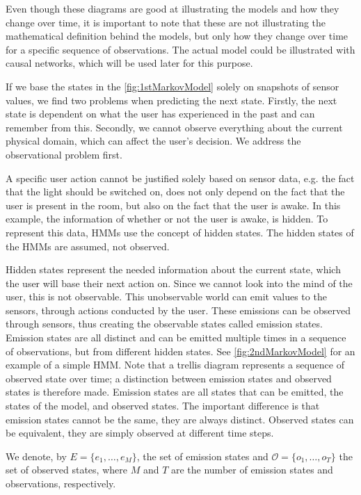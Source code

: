 Even though these diagrams are good at illustrating the models and how they change over time, it is important to note that these are not illustrating the mathematical definition behind the models, but only how they change over time for a specific sequence of observations. The actual model could be illustrated with causal networks, which will be used later for this purpose.

If we base the states in the \cref{fig:1stMarkovModel} solely on snapshots of sensor values, we find two problems when predicting the next state. Firstly, the next state is dependent on what the user has experienced in the past and can remember from this. Secondly, we cannot observe everything about the current physical domain, which can affect the user's decision. We address the observational problem first.

A specific user action cannot be justified solely based on sensor data, e.g. the fact that the light should be switched on, does not only depend on the fact that the user is present in the room, but also on the fact that the user is awake. In this example, the information of whether or not the user is awake, is hidden. To represent this data, HMMs use the concept of hidden states. The hidden states of the HMMs are assumed, not observed.

Hidden states represent the needed information about the current state, which the user will base their next action on. Since we cannot look into the mind of the user, this is not observable. This unobservable world can emit values to the sensors, through actions conducted by the user. These emissions can be observed through sensors, thus creating the observable states called emission states. Emission states are all distinct and can be emitted multiple times in a sequence of observations, but from different hidden states. See \cref{fig:2ndMarkovModel} for an example of a simple HMM. Note that a trellis diagram represents a sequence of observed state over time; a distinction between emission states and observed states is therefore made. Emission states are all states that can be emitted, the states of the model, and observed states. The important difference is that emission states cannot be the same, they are always distinct. Observed states can be equivalent, they are simply observed at different time steps.

We denote, by $E=\{e_1, \dots ,e_{M}\}$, the set of emission states and $\mathcal{O}=\{o_1, \dots , o_T\}$ the set of observed states, where $M$ and $T$ are the number of emission states and observations, respectively.

